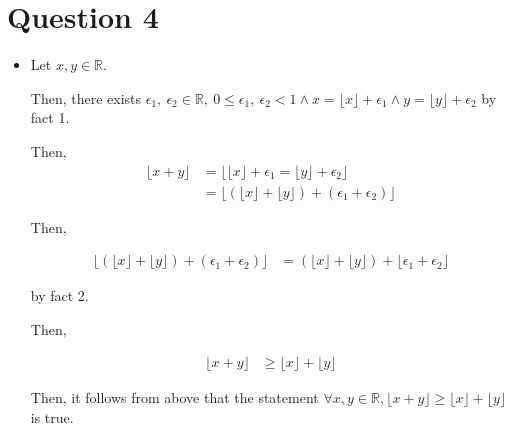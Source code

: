 \documentclass[12pt]{article}
\begin{document}
\section*{Question 4}
\begin{itemize}
    \item

    Let $x,y \in \mathbb{R}$.

    \bigskip

    Then, there exists $\epsilon_1,\:\epsilon_2 \in \mathbb{R},\:0 \leq
    \epsilon_1,\:\epsilon_2 < 1 \land x = \lfloor x \rfloor + \epsilon_1 \land y =
    \lfloor y \rfloor + \epsilon_2$ by fact 1.

    \bigskip

    Then,
    \setcounter{equation}{0}
    \begin{align}
        \lfloor x + y \rfloor &= \Big\lfloor \lfloor x \rfloor + \epsilon_1 = \lfloor y \rfloor + \epsilon_2 \Big\rfloor\\
        &= \Big\lfloor (\lfloor x \rfloor + \lfloor y \rfloor) + (\epsilon_1 + \epsilon_2) \Big\rfloor
    \end{align}

    \bigskip

    Then,

    \begin{align}
        \Big\lfloor (\lfloor x \rfloor + \lfloor y \rfloor) + (\epsilon_1 + \epsilon_2) \Big\rfloor &= (\lfloor x \rfloor + \lfloor y \rfloor) + \Big\lfloor \epsilon_1 + \epsilon_2 \Big\rfloor
    \end{align}

    by fact 2.

    \bigskip

    Then,

    \begin{align}
        \lfloor x + y \rfloor &\geq \lfloor x \rfloor + \lfloor y \rfloor
    \end{align}

    \bigskip

    Then, it follows from above that the statement $\forall x,y\in \mathbb{R}, \lfloor x + y
    \rfloor \geq \lfloor x \rfloor + \lfloor y \rfloor$ is true.


\end{itemize}
\end{document}
